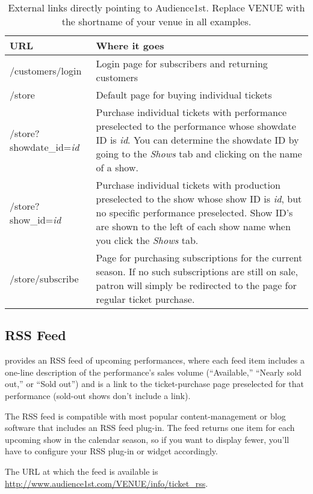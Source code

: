 \begin{table}
  \begin{tabular}{|l|p{}}
    \hline
    \textbf{URL} & \textbf{Where it goes} \\
    \hline
    /customers/login  & Login page for subscribers and returning
    customers \\
    /store & Default page for buying individual tickets \\
    /store?showdate\_id=\emph{id} & Purchase individual tickets with
    performance preselected to the performance whose showdate ID is \emph{id}.
    You can determine the showdate ID by going to the \emph{Shows} tab
    and clicking on the name of a show. \\
    /store?show\_id=\emph{id} & Purchase individual tickets with
    production preselected to the show whose show ID is \emph{id}, but
    no specific performance preselected.  Show
    ID's are shown to the left of each show name when you click the
    \emph{Shows} tab. \\
    /store/subscribe & Page for purchasing subscriptions for the current
    season.  If no such subscriptions are still on sale, patron will
    simply be redirected to the page for regular ticket purchase. \\
  \end{tabular}
\label{table:links}
\caption{External links directly pointing to Audience1st.  Replace
  VENUE with the shortname of your venue in all examples.}
\end{table}

\subsection{RSS Feed}
\label{sec:rss}

\af provides an RSS feed of upcoming performances, where each feed item
includes a one-line description of the performance's sales volume
(``Available,'' ``Nearly sold out,'' or ``Sold out'') and is a link to
the ticket-purchase page preselected for that performance (sold-out
shows don't include a link).

The RSS feed is compatible with most popular content-management or blog
software that includes an RSS feed plug-in.  The feed returns one item
for each upcoming show in the calendar season, so if you want to display
fewer, you'll have to configure your RSS plug-in or widget accordingly.

The URL at which the feed is available is
\url{http://www.audience1st.com/VENUE/info/ticket_rss}.

